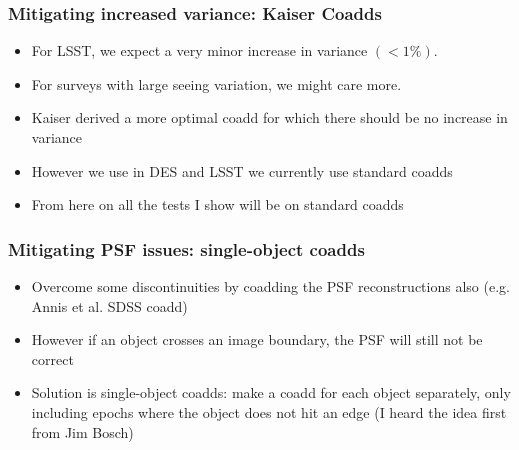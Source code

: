 \documentclass{beamer}
\begin{document}
\frame
{
    \frametitle{Mitigating increased variance: Kaiser Coadds}

    \begin{itemize}

        \item For LSST, we expect a very minor increase in variance $(< 1\%)$.

        \item For surveys with large seeing variation, we might care more.

        \item Kaiser derived a more optimal coadd for which there should be no
            increase in variance

        \item However we use in DES and LSST we currently use standard coadds

        \item From here on all the tests I show will be on standard coadds

    \end{itemize}

}



\frame
{
    \frametitle{Mitigating PSF issues: single-object coadds}

    \begin{itemize}

        \item Overcome some discontinuities by coadding the PSF reconstructions
            also (e.g. Annis et al. SDSS coadd)

        \item However if an object crosses an image boundary, the PSF will still not be correct

        \item Solution is single-object coadds: make a coadd for each object
            separately, only including epochs where the object does not hit an
            edge (I heard the idea first from Jim Bosch)


    \end{itemize}

}
\end{document}

